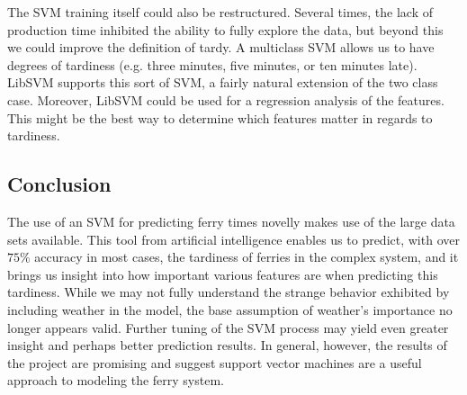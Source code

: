 \documentclass[11pt]{article} %
\begin{document}
The SVM training itself could also be restructured. Several times, the lack of
production time inhibited the ability to fully explore the data, but beyond this
we could improve the definition of tardy. A multiclass SVM allows us to have degrees
of tardiness (e.g. three minutes, five minutes, or ten minutes late). LibSVM 
supports this sort of SVM, a fairly natural extension of the two class case.
Moreover, LibSVM could be used for a regression analysis of the features. This might
be the best way to determine which features matter in regards to tardiness. 
 
\subsection{Conclusion}
\label{sec:conclusion}
The use of an SVM for predicting ferry times novelly makes use of the large data 
sets available. This tool from artificial intelligence enables us to predict, with
over $75\%$ accuracy in most cases, the tardiness of ferries in the complex system,
and it brings us insight into how important various features are when predicting
this tardiness. While we may not fully understand the strange behavior exhibited
by including weather in the model, the base assumption of weather's importance no 
longer appears valid. Further tuning of the SVM process may yield even
greater insight and perhaps better prediction results. In general, however, the 
results of the project are promising and suggest support vector machines are
a useful approach to modeling the ferry system.

\newpage 



\end{document}
